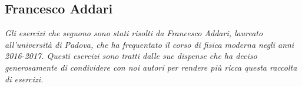\documentclass[12pt,twoside,a4]{article}
\begin{document}

\newpage
\subsection{Francesco Addari}

\textit{\indent Gli esercizi che seguono sono stati risolti da Francesco Addari, laureato all'università  di Padova, che ha frequentato il corso di fisica moderna negli anni 2016-2017. Questi esercizi sono tratti dalle sue dispense che ha deciso generosamente di condividere con noi autori per rendere più ricca questa raccolta di esercizi.}
\end{document}
